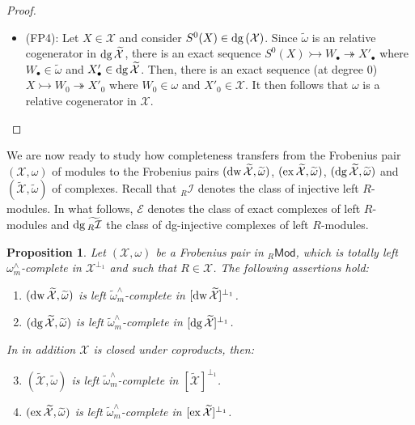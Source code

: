 \documentclass[10pt,reqno]{amsart}
\numberwithin{equation}{section}
\newtheorem{proposition}[definition]{Proposition}
\theoremstyle{remark}
\newcommand{\X}{\mathcal{X}}
\begin{document}
\begin{proof}
\begin{itemize}
\item {\sf (FP4)}: Let $X \in \X$ and consider $S^0(X) \in {\rm dg}\,(\X)$. Since $\widetilde{\omega}$ is an relative cogenerator in ${\rm dg}\,\widetilde{\X}$, there is an exact sequence $S^0(X) \rightarrowtail W_\bullet \twoheadrightarrow X'_\bullet$ where $W_\bullet \in \widetilde{\omega}$ and $X'_\bullet \in {\rm dg}\,\widetilde{\X}$. Then, there is an exact sequence (at degree 0) $X \rightarrowtail W_0 \twoheadrightarrow X'_0$ where $W_0 \in \omega$ and $X'_0 \in \X$. It then follows that $\omega$ is a relative cogenerator in $\X$. 
\end{itemize}
\end{proof}


We are now ready to study how completeness transfers from the Frobenius pair $(\X,\omega)$ of modules to the Frobenius pairs $({\rm dw}\,\widetilde{\X},\widetilde{\omega})$, $({\rm ex}\,\widetilde{\X},\widetilde{\omega})$, $({\rm dg}\,\widetilde{\X},\widetilde{\omega})$ and $(\widetilde{\X},\widetilde{\omega})$ of complexes. Recall that ${}_R\mathcal{I}$ denotes the class of injective left $R$-modules. In what follows, $\mathcal{E}$ denotes the class of exact complexes of left $R$-modules and ${\rm dg}\,\widetilde{{}_R\mathcal{I}}$ the class of dg-injective complexes of left $R$-modules. 


\begin{proposition}
Let $(\X,\omega)$ be a Frobenius pair in ${}_R\mathsf{Mod}$, which is totally left $\omega^\wedge_m$-complete in $\X ^{\perp _1}$ and such that $R \in \X$. The following assertions hold:
\begin{enumerate}[(1)]
\item $({\rm dw}\,\widetilde{\X}, \widetilde{\omega})$ is left $\widetilde{\omega}^\wedge_m$-complete in $[{\rm dw}\,\widetilde{\X}]^{\perp_1}$.

\item $({\rm dg}\,\widetilde{\X}, \widetilde{\omega})$ is left $\widetilde{\omega}^\wedge_m$-complete in $[{\rm dg}\,\widetilde{\X}]^{\perp_1}$.
\end{enumerate}
In in addition $\X$ is closed under coproducts, then:
\begin{enumerate}[(1)]
\setcounter{enumi}{2}
\item $(\widetilde{\X}, \widetilde{\omega})$ is left $\widetilde{\omega}^\wedge_m$-complete in $[\widetilde{\X}]^{\perp_1}$. 

\item $({\rm ex}\,\widetilde{\X}, \widetilde{\omega})$ is left $\widetilde{\omega}^\wedge_m$-complete in $[{\rm ex}\,\widetilde{\X}]^{\perp_1}$. \\
\end{enumerate}
\end{proposition}
\end{document}
